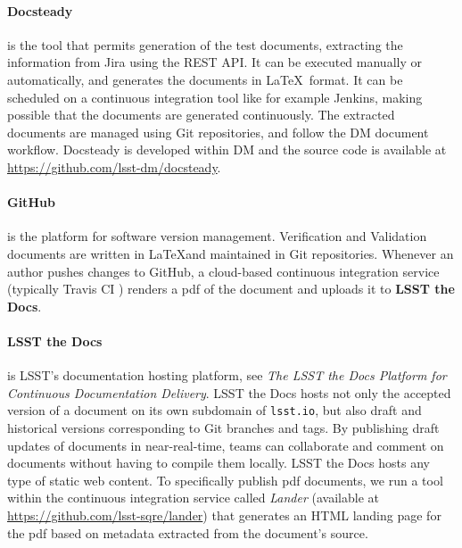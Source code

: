 \paragraph{Docsteady}
is the tool that permits generation of the test documents, extracting the information from Jira using the REST API.
It can be executed manually or automatically, and generates the documents in \LaTeX~format.
It can be scheduled on a continuous integration tool like for example Jenkins, making possible that
the documents are generated continuously.
The extracted documents are managed using Git repositories, and follow the  DM document workflow.
Docsteady is developed within DM and the source code is available at \url{https://github.com/lsst-dm/docsteady}.


\paragraph{GitHub}
is the platform for software version management.
Verification and Validation documents are written in \LaTeX and maintained in Git repositories.
Whenever an author pushes changes to GitHub, a cloud-based continuous integration service (typically Travis CI
) renders a pdf of the document and uploads it to \textbf{LSST the Docs}.

\paragraph{LSST the Docs}
is LSST's documentation hosting platform, see \textit{The LSST the Docs Platform for Continuous Documentation Delivery}\cite{SQR-006}.
LSST the Docs hosts not only the accepted version of a document on its own subdomain of \texttt{lsst.io}, but also draft and
historical versions corresponding to Git branches and tags.
By publishing draft updates of documents in near-real-time, teams can collaborate and comment on documents without having to
compile them locally.
LSST the Docs hosts any type of static web content.
To specifically publish pdf documents, we run a tool within the continuous integration service called \textit{Lander}
(available at \url{https://github.com/lsst-sqre/lander})
that generates an HTML landing page for the pdf based on metadata extracted from the document's source.

